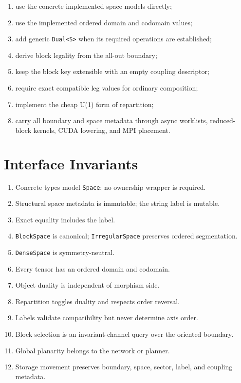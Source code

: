 \documentclass[11pt]{article}
\begin{document}
\begin{enumerate}
  \item use the concrete implemented space models directly;
  \item use the implemented ordered domain and codomain values;
  \item add generic \texttt{Dual<S>} when its required operations are
        established;
  \item derive block legality from the all-out boundary;
  \item keep the block key extensible with an empty coupling
        descriptor;
  \item require exact compatible leg values for ordinary composition;
  \item implement the cheap U(1) form of repartition;
  \item carry all boundary and space metadata through async worklists,
        reduced-block kernels, CUDA lowering, and MPI placement.
\end{enumerate}

\section{Interface Invariants}

\begin{enumerate}
  \item Concrete types model \texttt{Space}; no ownership wrapper is
        required.
  \item Structural space metadata is immutable; the string label is
        mutable.
  \item Exact equality includes the label.
  \item \texttt{BlockSpace} is canonical; \texttt{IrregularSpace}
        preserves ordered segmentation.
  \item \texttt{DenseSpace} is symmetry-neutral.
  \item Every tensor has an ordered domain and codomain.
  \item Object duality is independent of morphism side.
  \item Repartition toggles duality and respects order reversal.
  \item Labels validate compatibility but never determine axis order.
  \item Block selection is an invariant-channel query over the
        oriented boundary.
  \item Global planarity belongs to the network or planner.
  \item Storage movement preserves boundary, space, sector, label, and
        coupling metadata.
\end{enumerate}
\end{document}
